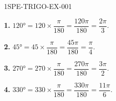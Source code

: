 \begin{corrige}{1SPE-TRIGO-EX-001}


\textbf{1.} $120° = 120 \times \dfrac{\pi}{180} = \dfrac{120\pi}{180} = \dfrac{2\pi}{3}$.

\textbf{2.} $45° = 45 \times \dfrac{\pi}{180} = \dfrac{45\pi}{180} = \dfrac{\pi}{4}$.

\textbf{3.} $270° = 270 \times \dfrac{\pi}{180} = \dfrac{270\pi}{180} = \dfrac{3\pi}{2}$.

\textbf{4.} $330° = 330 \times \dfrac{\pi}{180} = \dfrac{330\pi}{180} = \dfrac{11\pi}{6}$.

\end{corrige}
